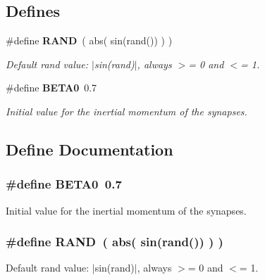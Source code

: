 \subsection*{Defines}
\begin{CompactItemize}
\item 
\#define {\bf RAND}~( abs( sin(rand()) ) )
\begin{CompactList}\small\item\em Default rand value: $|$sin(rand)$|$, always $>$= 0 and $<$= 1. \item\end{CompactList}\item 
\#define {\bf BETA0}~0.7
\begin{CompactList}\small\item\em Initial value for the inertial momentum of the synapses. \item\end{CompactList}\end{CompactItemize}


\subsection{Define Documentation}
\subsubsection[BETA0]{\setlength{\rightskip}{0pt plus 5cm}\#define BETA0~0.7}\label{neural_09_09_8hpp_05e2bb5b9fc32f0b6b4d84fe43177d72}


Initial value for the inertial momentum of the synapses. 

\subsubsection[RAND]{\setlength{\rightskip}{0pt plus 5cm}\#define RAND~( abs( sin(rand()) ) )}\label{neural_09_09_8hpp_839a9222721835f53c5b248241f535f4}


Default rand value: $|$sin(rand)$|$, always $>$= 0 and $<$= 1. 

